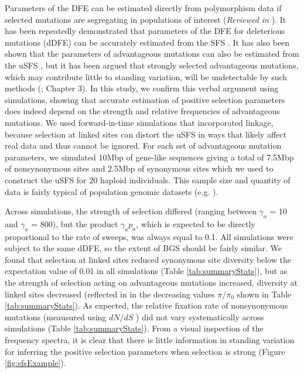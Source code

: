 \documentclass[11pt]{article}
\begin{document}
	Parameters of the DFE can be estimated directly from polymorphism data if selected mutations are segregating in populations of interest (\textit{Reviewed in} \citealt{RN109}). It has been repeatedly demonstrated that parameters of the DFE for deleterious mutations (dDFE) can be accurately estimated from the SFS \citep{RN201, RN164, RN178, RN354}. It has also been shown that the parameters of advantageous mutations can also be estimated from the uSFS \citep{RN210, RN354}, but it has been argued that strongly selected advantageous mutations, which may contribute little to standing variation, will be undetectable by such methods (\citealt{RN290}; Chapter 3). In this study, we confirm this verbal argument using simulations, showing that accurate estimation of positive selection parameters does indeed depend on the strength and relative frequencies of advantageous mutations. We used forward-in-time simulations that incorporated linkage, because selection at linked sites can distort the uSFS in ways that likely affect real data and thus cannot be ignored. For each set of advantageous mutation parameters, we simulated 10Mbp of gene-like sequences giving a total of 7.5Mbp of nonsynonymous sites and 2.5Mbp of synonymous sites which we used to construct the uSFS for 20 haploid individuals. This sample size and quantity of data is fairly typical of population genomic datasets (e.g. \citealt{RN236, RN238, RN368}). 

	Across simulations, the strength of selection differed (ranging between $\gamma_a$ = 10 and $\gamma_a$ = 800), but the product $\gamma_a p_a$, which is expected to be directly proportional to the rate of sweeps, was always equal to 0.1. All simulations were subject to the same dDFE, so the extent of BGS should be fairly similar. We found that selection at linked sites reduced synonymous site diversity below the expectation value of 0.01 in all simulations (Table \ref{tab:summaryStats}),  but as the strength of selection acting on advantageous mutations increased, diversity at linked sites decreased (reflected in in the decreasing values $\pi/\pi_0$ shown in Table \ref{tab:summaryStats}). As expected, the relative fixation rate of nonsynonymous mutations (meausured using  $dN/dS$ ) did not vary systematically across simulations (Table \ref{tab:summaryStats}). From a visual inspection of the frequency spectra, it is clear that there is little information in standing variation for inferring the positive selection parameters when selection is strong (Figure \ref{fig:sfsExample}).
	
\end{document}
